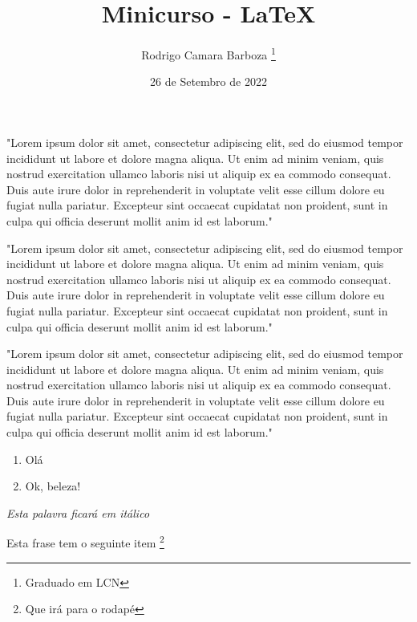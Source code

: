\documentclass[12pt, a4paper, oneside]{book}
\begin{document}
\tableofcontents
\listoffigures

\title{Minicurso - LaTeX}
\author {Rodrigo Camara Barboza \footnote{Graduado em LCN}}
\date {26 de Setembro de 2022}
\maketitle

"Lorem ipsum dolor sit amet, consectetur adipiscing elit, sed do eiusmod tempor incididunt ut labore et dolore magna aliqua. Ut enim ad minim veniam, quis nostrud exercitation ullamco laboris nisi ut aliquip ex ea commodo consequat. Duis aute irure dolor in reprehenderit in voluptate velit esse cillum dolore eu fugiat nulla pariatur. Excepteur sint occaecat cupidatat non proident, sunt in culpa qui officia deserunt mollit anim id est laborum." \newline

"Lorem ipsum dolor sit amet, consectetur adipiscing elit, sed do eiusmod tempor incididunt ut labore et dolore magna aliqua. Ut enim ad minim veniam, quis nostrud exercitation ullamco laboris nisi ut aliquip ex ea commodo consequat. Duis aute irure dolor in reprehenderit in voluptate velit esse cillum dolore eu fugiat nulla pariatur. Excepteur sint occaecat cupidatat non proident, sunt in culpa qui officia deserunt mollit anim id est laborum."

"Lorem ipsum dolor sit amet, consectetur adipiscing elit, sed do eiusmod tempor incididunt ut labore et dolore magna aliqua. Ut enim ad minim veniam, quis nostrud exercitation ullamco laboris nisi ut aliquip ex ea commodo consequat. Duis aute irure dolor in reprehenderit in voluptate velit esse cillum dolore eu fugiat nulla pariatur. Excepteur sint occaecat cupidatat non proident, sunt in culpa qui officia deserunt mollit anim id est laborum."

\begin{enumerate}
	\item Olá
	\item Ok, beleza!
\end{enumerate}

\textit {Esta palavra ficará em itálico}

Esta frase tem o seguinte item \footnote{Que irá para o rodapé}

%

\vspace{1cm}
\end{document}
